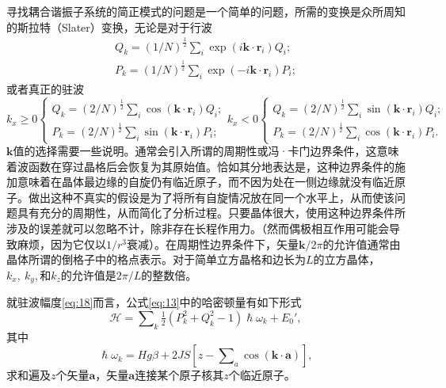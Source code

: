 \documentclass{article}
\begin{document}
寻找耦合谐振子系统的简正模式的问题是一个简单的问题，所需的变换是众所周知的斯拉特（Slater）变换，无论是对于行波
\begin{equation} \label{eq:17}
\begin{array}{l}
Q_k=(1/N)^{\frac{1}{2}}\sum\nolimits_{i}\exp(i\mathbf{k}\cdot\mathbf{r}_i)Q_i;\\
P_k=(1/N)^{\frac{1}{2}}\sum\nolimits_{i}\exp(-i\mathbf{k}\cdot\mathbf{r}_i)P_i;
\end{array}
\end{equation}
或者真正的驻波
\begin{subequations} \label{eq:18}
\begin{equation}
k_x \geqslant 0 \left\{
\begin{array}{l}
Q_k=(2/N)^{\frac{1}{2}}\sum\nolimits_{i}\cos(\mathbf{k}\cdot\mathbf{r}_i)Q_i;\\
P_k=(2/N)^{\frac{1}{2}}\sum\nolimits_{i}\sin(\mathbf{k}\cdot\mathbf{r}_i)P_i;
\end{array}
\right.
\end{equation}
\begin{equation}
k_x < 0 \left\{
\begin{array}{l}
Q_k=(2/N)^{\frac{1}{2}}\sum\nolimits_{i}\sin(\mathbf{k}\cdot\mathbf{r}_i)Q_i;\\
P_k=(2/N)^{\frac{1}{2}}\sum\nolimits_{i}\cos(\mathbf{k}\cdot\mathbf{r}_i)P_i.
\end{array}
\right.
\end{equation}
\end{subequations}
$\mathbf{k}$值的选择需要一些说明。通常会引入所谓的周期性或冯·卡门边界条件，这意味着波函数在穿过晶格后会恢复为其原始值。恰如其分地表达是，这种边界条件的施加意味着在晶体最边缘的自旋仍有临近原子，而不因为处在一侧边缘就没有临近原子。做出这种不真实的假设是为了将所有自旋情况放在同一个水平上，从而使该问题具有充分的周期性，从而简化了分析过程。只要晶体很大，使用这种边界条件所涉及的误差就可以忽略不计，除非存在长程作用力。（然而偶极相互作用可能会导致麻烦，因为它仅以$1/r^3$衰减）。在周期性边界条件下，矢量$\mathbf{k}/2\pi$的允许值通常由晶体所谓的倒格子中的格点表示。对于简单立方晶格和边长为$L$的立方晶体，$k_x,~k_y,$和$k_z$的允许值是$2\pi/L$的整数倍。

就驻波幅度\eqref{eq:18}而言，公式\eqref{eq:13}中的哈密顿量有如下形式
\begin{equation} \label{eq:19}
\mathcal{H}=\sum\nolimits_k\tfrac{1}{2}(P_k^2+Q_k^2-1)\hslash\omega_k+E_0',
\end{equation}
其中
\begin{equation} \label{eq:20}
\hslash\omega_k=Hg\beta+2JS[z-\sum\nolimits_a\cos(\mathbf{k}\cdot\mathbf{a})],
\end{equation} 
求和遍及$z$个矢量$\mathbf{a}$，矢量$\mathbf{a}$连接某个原子核其$z$个临近原子。
\end{document}
